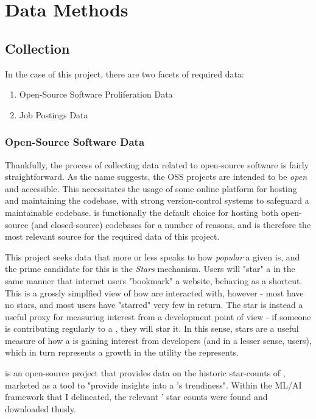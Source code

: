 \chapter{Data Methods}

\section{Collection}

In the case of this project, there are two facets of required data:
\begin{enumerate}
  \item Open-Source Software Proliferation Data
  \item Job Postings Data
\end{enumerate}

\subsection{Open-Source Software Data}
Thankfully, the process of collecting data related to open-source software is fairly straightforward.
As the name suggests, the OSS projects are intended to be \emph{open} and accessible.
This necessitates the usage of some online platform for hosting and maintaining the codebase, with strong version-control systems to safeguard a maintainable codebase. \gh{} is functionally the default choice for hosting both open-source (and closed-source) codebases for a number of reasons, and is therefore the most relevant source for the required data of this project.

This project seeks data that more or less speaks to how \emph{popular} a given \ghrepo{} is, and the prime candidate for this is the \emph{\gh{} Stars} mechanism. Users will "star" a \repo{} in the same manner that internet users "bookmark" a website, behaving as a shortcut. This is a grossly simplfied view of how \ghrepo{} are interacted with, however - most \ghrepo{} have no stars, and most users have "starred" very few \repos{} in return. The star is instead a useful proxy for measuring interest from a development point of view - if someone is contributing regularly to a \repo{}, they will star it. In this sense, stars are a useful measure of how a \repo{} is gaining interest from developers (and in a lesser sense, users), which in turn represents a growth in the utility the \repo{} represents.

\cite{__GitHubDaily} is an open-source project that provides data on the historic star-counts of \ghrepo{}, marketed as a tool to "provide insights into a \repo{}'s trendiness". Within the ML/AI framework that I delineated, the relevant \repos{}' star counts were found and downloaded thusly.

